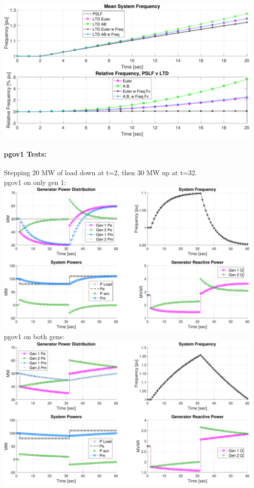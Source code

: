 \documentclass[12pt]{article}
\begin{document}
\includegraphics[width=\linewidth]{noGovExcLoadStepDfreq}
\pagebreak

\paragraph{pgov1 Tests:}Stepping 20 MW of load down at t=2, then 30 MW up at t=32.\\
pgov1 on only gen 1:  \vspace{1em}\\
\includegraphics[width=\linewidth]{pgov1x1}
pgov1 on both gens:\\
\includegraphics[width=\linewidth]{pgov1x2}
\end{document}
